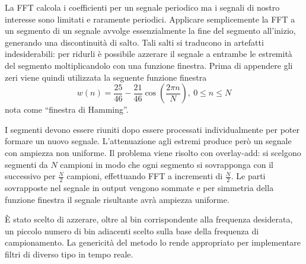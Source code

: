 La FFT calcola i coefficienti per un segnale periodico ma i segnali di nostro interesse sono limitati e raramente periodici.
Applicare semplicemente la FFT a un segmento di un segnale avvolge essenzialmente la fine del segmento all'inizio, generando una discontinuità di salto.
Tali salti si traducono in artefatti indesiderabili: per ridurli è possibile azzerare il segnale a entrambe le estremità del segmento moltiplicandolo con una funzione finestra.
Prima di appendere gli zeri viene quindi utilizzata la seguente funzione finestra
$$
w(n) = \frac{25}{46} - \frac{21}{46}\cos{\left( \dfrac{2\pi n}{N} \right)}, \ 0 \leq n \leq N
$$
nota come ``finestra di Hamming''\cite{Harris78onthe}.

I segmenti devono essere riuniti dopo essere processati individualmente per poter formare un nuovo segnale.
L'attenuazione agli estremi produce però un segnale con ampiezza non uniforme. Il problema viene risolto con overlay-add: si scelgono segmenti da $N$ campioni in modo che ogni segmento
si sovrapponga con il successivo per $\frac{N}{2}$ campioni, effettuando FFT a incrementi di $\frac{N}{2}$.
Le parti sovrapposte nel segnale in output vengono sommate e per simmetria della funzione finestra il segnale risultante avrà ampiezza uniforme.

È stato scelto di azzerare, oltre al bin corrispondente alla frequenza desiderata, un piccolo numero di bin adiacenti scelto sulla base della frequenza di campionamento.
La genericità del metodo lo rende appropriato per implementare filtri di diverso tipo in tempo reale.

